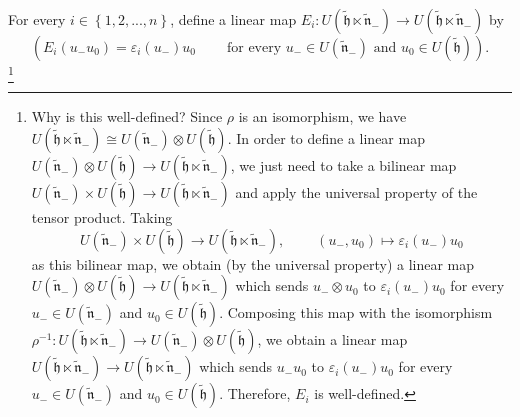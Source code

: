 \documentclass[etingof-lie.tex]{subfiles}
\begin{document}
\begin{vershort}
For every $i\in\left\{  1,2,...,n\right\}  $, define a linear map
$E_{i}:U\left(  \widetilde{\mathfrak{h}}\ltimes\widetilde{\mathfrak{n}}%
_{-}\right)  \rightarrow U\left(  \widetilde{\mathfrak{h}}\ltimes
\widetilde{\mathfrak{n}}_{-}\right)  $ by%
\begin{equation}
\left(  E_{i}\left(  u_{-}u_{0}\right)  =\varepsilon_{i}\left(  u_{-}\right)
u_{0}\ \ \ \ \ \ \ \ \ \ \text{for every }u_{-}\in U\left(
\widetilde{\mathfrak{n}}_{-}\right)  \text{ and }u_{0}\in U\left(
\widetilde{\mathfrak{h}}\right)  \right)  . \label{pf.gtilde.b.Ei.short}%
\end{equation}
\footnote{Why is this well-defined? Since $\rho$ is an isomorphism, we have
$U\left(  \widetilde{\mathfrak{h}}\ltimes\widetilde{\mathfrak{n}}_{-}\right)
\cong U\left(  \widetilde{\mathfrak{n}}_{-}\right)  \otimes U\left(
\widetilde{\mathfrak{h}}\right)  $. In order to define a linear map $U\left(
\widetilde{\mathfrak{n}}_{-}\right)  \otimes U\left(  \widetilde{\mathfrak{h}%
}\right)  \rightarrow U\left(  \widetilde{\mathfrak{h}}\ltimes
\widetilde{\mathfrak{n}}_{-}\right)  $, we just need to take a bilinear map
$U\left(  \widetilde{\mathfrak{n}}_{-}\right)  \times U\left(
\widetilde{\mathfrak{h}}\right)  \rightarrow U\left(  \widetilde{\mathfrak{h}%
}\ltimes\widetilde{\mathfrak{n}}_{-}\right)  $ and apply the universal
property of the tensor product. Taking%
\[
U\left(  \widetilde{\mathfrak{n}}_{-}\right)  \times U\left(
\widetilde{\mathfrak{h}}\right)  \rightarrow U\left(  \widetilde{\mathfrak{h}%
}\ltimes\widetilde{\mathfrak{n}}_{-}\right)  ,\ \ \ \ \ \ \ \ \ \ \left(
u_{-},u_{0}\right)  \mapsto\varepsilon_{i}\left(  u_{-}\right)  u_{0}%
\]
as this bilinear map, we obtain (by the universal property) a linear map
$U\left(  \widetilde{\mathfrak{n}}_{-}\right)  \otimes U\left(
\widetilde{\mathfrak{h}}\right)  \rightarrow U\left(  \widetilde{\mathfrak{h}%
}\ltimes\widetilde{\mathfrak{n}}_{-}\right)  $ which sends $u_{-}\otimes
u_{0}$ to $\varepsilon_{i}\left(  u_{-}\right)  u_{0}$ for every $u_{-}\in
U\left(  \widetilde{\mathfrak{n}}_{-}\right)  $ and $u_{0}\in U\left(
\widetilde{\mathfrak{h}}\right)  $. Composing this map with the isomorphism
$\rho^{-1}:U\left(  \widetilde{\mathfrak{h}}\ltimes\widetilde{\mathfrak{n}%
}_{-}\right)  \rightarrow U\left(  \widetilde{\mathfrak{n}}_{-}\right)
\otimes U\left(  \widetilde{\mathfrak{h}}\right)  $, we obtain a linear map
$U\left(  \widetilde{\mathfrak{h}}\ltimes\widetilde{\mathfrak{n}}_{-}\right)
\rightarrow U\left(  \widetilde{\mathfrak{h}}\ltimes\widetilde{\mathfrak{n}%
}_{-}\right)  $ which sends $u_{-}u_{0}$ to $\varepsilon_{i}\left(
u_{-}\right)  u_{0}$ for every $u_{-}\in U\left(  \widetilde{\mathfrak{n}}%
_{-}\right)  $ and $u_{0}\in U\left(  \widetilde{\mathfrak{h}}\right)  $.
Therefore, $E_{i}$ is well-defined.}
\end{vershort}
\end{document}
